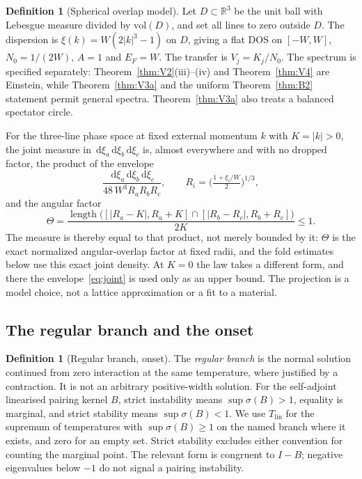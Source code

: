 \documentclass[11pt]{article}
\newcommand{\Tlin}{T_{\mathrm{lin}}}
\newcommand{\dd}{\,\mathrm d}
\theoremstyle{definition}
\newtheorem{definition}[theorem]{Definition}
\theoremstyle{remark}
\begin{document}
\begin{definition}[Spherical overlap model]\label{def:spherical}
Let $D\subset\mathbb R^3$ be the unit ball with Lebesgue measure divided by $\mathrm{vol}(D)$, and set all lines to zero outside $D$. The dispersion is $\xi(k)=W(2|k|^3-1)$ on $D$, giving a flat DOS on $[-W,W]$, $N_0=1/(2W)$, $A=1$ and $E_F=W$. The transfer is $V_j=K_j/N_0$. The spectrum is specified separately: Theorem~\ref{thm:V2}(iii)--(iv) and Theorem~\ref{thm:V4} are Einstein, while Theorem~\ref{thm:V3a} and the uniform Theorem~\ref{thm:B2} statement permit general spectra. Theorem~\ref{thm:V3a} also treats a balanced spectator circle.
\end{definition}

For the three-line phase space at fixed external momentum $k$ with $K=|k|>0$, the joint measure in $\dd\xi_a\dd\xi_b\dd\xi_c$ is, almost everywhere and with no dropped factor, the product of the envelope
\begin{equation}\label{eq:joint}
\frac{\dd\xi_a\dd\xi_b\dd\xi_c}{48\,W^3R_aR_bR_c},\qquad R_i=\Big(\tfrac{1+\xi_i/W}{2}\Big)^{1/3},
\end{equation}
and the angular factor
\[
\Theta=\frac{\operatorname{length}\big([|R_a-K|,R_a+K]\cap[|R_b-R_c|,R_b+R_c]\big)}{2K}\le1 .
\]
The measure is thereby equal to that product, not merely bounded by it: $\Theta$ is the exact normalized angular-overlap factor at fixed radii, and the fold estimates below use this exact joint density. At $K=0$ the law takes a different form, and there the envelope~\eqref{eq:joint} is used only as an upper bound. The projection is a model choice, not a lattice approximation or a fit to a material.

\subsection{The regular branch and the onset}

\begin{definition}[Regular branch, onset]\label{def:regular}
The \emph{regular branch} is the normal solution continued from zero interaction at the same temperature, where justified by a contraction. It is not an arbitrary positive-width solution. For the self-adjoint linearised pairing kernel $B$, strict instability means $\sup\sigma(B)>1$, equality is marginal, and strict stability means $\sup\sigma(B)<1$. We use $\Tlin$ for the supremum of temperatures with $\sup\sigma(B)\ge1$ on the named branch where it exists, and zero for an empty set. Strict stability excludes either convention for counting the marginal point. The relevant form is congruent to $I-B$; negative eigenvalues below $-1$ do not signal a pairing instability.
\end{definition}
\end{document}
